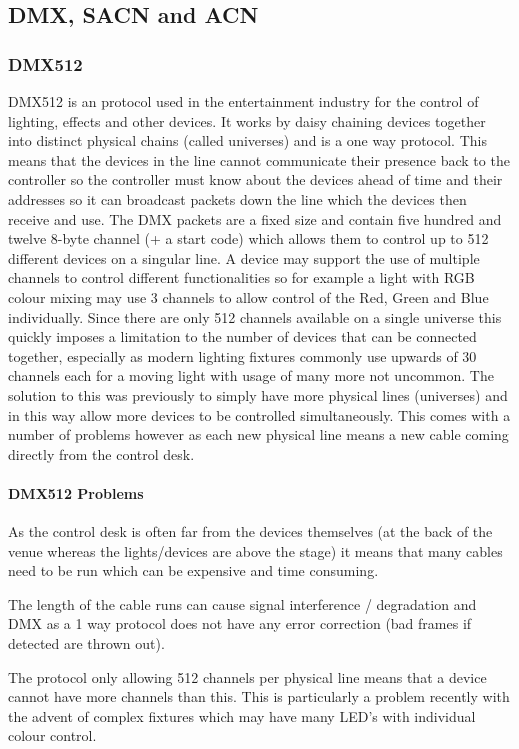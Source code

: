 \documentclass[11pt,a4paper]{report}
\begin{document}
	\subsection{DMX, SACN and ACN}
	\subsubsection{DMX512} DMX512 is an protocol used in the entertainment industry for the control of lighting, effects and other devices. It works by daisy chaining devices together into distinct physical chains (called universes) and is a one way protocol. This means that the devices in the line cannot communicate their presence back to the controller so the controller must know about the devices ahead of time and their addresses so it can broadcast packets down the line which the devices then receive and use. The DMX packets are a fixed size and contain five hundred and twelve 8-byte channel (+ a start code) which allows them to control up to 512 different devices on a singular line. A device may support the use of multiple channels to control different functionalities so for example a light with RGB colour mixing may use 3 channels to allow control of the Red, Green and Blue individually. Since there are only 512 channels available on a single universe this quickly imposes a limitation to the number of devices that can be connected together, especially as modern lighting fixtures commonly use upwards of 30 channels each for a moving light with usage of many more not uncommon. The solution to this was previously to simply have more physical lines (universes) and in this way allow more devices to be controlled simultaneously. This comes with a number of problems however as each new physical line means a new cable coming directly from the control desk.
	
	\paragraph*{DMX512 Problems}
	\begin{list}{}{}
		\item As the control desk is often far from the devices themselves (at the back of the venue whereas the lights/devices are above the stage) it means that many cables need to be run which can be expensive and time consuming.
		\item The length of the cable runs can cause signal interference / degradation and DMX as a 1 way protocol does not have any error correction (bad frames if detected are thrown out).
		\item The protocol only allowing 512 channels per physical line means that a device cannot have more channels than this. This is particularly a problem recently with the advent of complex fixtures which may have many LED's with individual colour control.
	\end{list}
	
\end{document}
